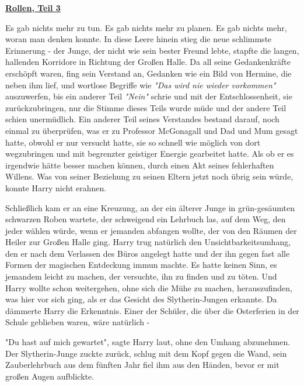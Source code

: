 

\hypertarget{rollen-teil-3}{%

\textbf{\uline{Rollen, Teil 3}}

Es gab nichts mehr zu tun. Es gab nichts mehr zu planen. Es gab nichts mehr, woran man denken konnte. In diese Leere hinein stieg die neue schlimmste Erinnerung - der Junge, der nicht wie sein bester Freund lebte, stapfte die langen, hallenden Korridore in Richtung der Großen Halle. Da all seine Gedankenkräfte erschöpft waren, fing sein Verstand an, Gedanken wie ein Bild von Hermine, die neben ihm lief, und wortlose Begriffe wie \emph{"Das wird nie wieder vorkommen"} auszuwerfen, bis ein anderer Teil \emph{"Nein"} schrie und mit der Entschlossenheit, sie zurückzubringen, nur die Stimme dieses Teils wurde müde und der andere Teil schien unermüdlich. Ein anderer Teil seines Verstandes bestand darauf, noch einmal zu überprüfen, was er zu Professor McGonagall und Dad und Mum gesagt hatte, obwohl er nur versucht hatte, sie so schnell wie möglich von dort wegzubringen und mit begrenzter geistiger Energie gearbeitet hatte. Als ob er es irgendwie hätte besser machen können, durch einen Akt seines fehlerhaften Willens. Was von seiner Beziehung zu seinen Eltern jetzt noch übrig sein würde, konnte Harry nicht erahnen.

Schließlich kam er an eine Kreuzung, an der ein älterer Junge in grün-gesäumten schwarzen Roben wartete, der schweigend ein Lehrbuch las, auf dem Weg, den jeder wählen würde, wenn er jemanden abfangen wollte, der von den Räumen der Heiler zur Großen Halle ging. Harry trug natürlich den Unsichtbarkeitsumhang, den er nach dem Verlassen des Büros angelegt hatte und der ihn gegen fast alle Formen der magischen Entdeckung immun machte. Es hatte keinen Sinn, es jemandem leicht zu machen, der versuchte, ihn zu finden und zu töten. Und Harry wollte schon weitergehen, ohne sich die Mühe zu machen, herauszufinden, was hier vor sich ging, als er das Gesicht des Slytherin-Jungen erkannte. Da dämmerte Harry die Erkenntnis. Einer der Schüler, die über die Osterferien in der Schule geblieben waren, wäre natürlich -

"Du hast auf mich gewartet", sagte Harry laut, ohne den Umhang abzunehmen. Der Slytherin-Junge zuckte zurück, schlug mit dem Kopf gegen die Wand, sein Zauberlehrbuch aus dem fünften Jahr fiel ihm aus den Händen, bevor er mit großen Augen aufblickte.

}

